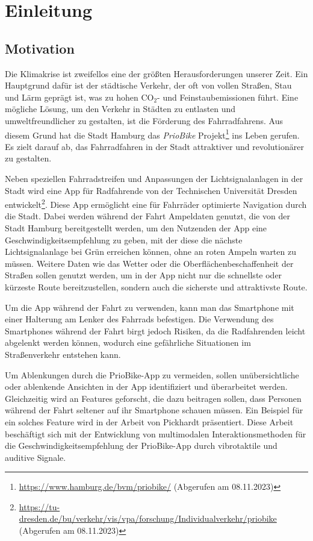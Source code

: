 \chapter{Einleitung}\label{sec:introduction}

\section{Motivation}\label{sec:introduction:motivation}

Die Klimakrise ist zweifellos eine der größten Herausforderungen unserer Zeit. Ein Hauptgrund dafür ist der städtische Verkehr, der oft von vollen Straßen, Stau und Lärm geprägt ist, was zu hohen $\text{CO}_\text{2}$- und Feinstaubemissionen führt. Eine mögliche Lösung, um den Verkehr in Städten zu entlasten und umweltfreundlicher zu gestalten, ist die Förderung des Fahrradfahrens. Aus diesem Grund hat die Stadt Hamburg das \textit{PrioBike} Projekt\footnote{\url{https://www.hamburg.de/bvm/priobike/} (Abgerufen am 08.11.2023)} ins Leben gerufen. Es zielt darauf ab, das Fahrradfahren in der Stadt attraktiver und revolutionärer zu gestalten. 

Neben speziellen Fahrradstreifen und Anpassungen der Lichtsignalanlagen in der Stadt wird eine App für Radfahrende von der Technischen Universität Dresden entwickelt\footnote{\url{https://tu-dresden.de/bu/verkehr/vis/vpa/forschung/Individualverkehr/priobike} (Abgerufen am 08.11.2023)}. Diese App ermöglicht eine für Fahrräder optimierte Navigation durch die Stadt. Dabei werden während der Fahrt Ampeldaten genutzt, die von der Stadt Hamburg bereitgestellt werden, um den Nutzenden der App eine Geschwindigkeitsempfehlung zu geben, mit der diese die nächste Lichtsignalanlage bei Grün erreichen können, ohne an roten Ampeln warten zu müssen. Weitere Daten wie das Wetter oder die Oberflächenbeschaffenheit der Straßen sollen genutzt werden, um in der App nicht nur die schnellste oder kürzeste Route bereitzustellen, sondern auch die sicherste und attraktivste Route. 

Um die App während der Fahrt zu verwenden, kann man das Smartphone mit einer Halterung am Lenker des Fahrrads befestigen. Die Verwendung des Smartphones während der Fahrt birgt jedoch Risiken, da die Radfahrenden leicht abgelenkt werden können, wodurch eine gefährliche Situationen im Straßenverkehr entstehen kann. 

Um Ablenkungen durch die PrioBike-App zu vermeiden, sollen unübersichtliche oder ablenkende Ansichten in der App identifiziert und überarbeitet werden. Gleichzeitig wird an Features geforscht, die dazu beitragen sollen, dass Personen während der Fahrt seltener auf ihr Smartphone schauen müssen. Ein Beispiel für ein solches Feature wird in der Arbeit von Pickhardt \cite{diplom:paul:pickhardt} präsentiert. Diese Arbeit beschäftigt sich mit der Entwicklung von multimodalen Interaktionsmethoden für die Geschwindigkeitsempfehlung der PrioBike-App durch vibrotaktile und auditive Signale.

